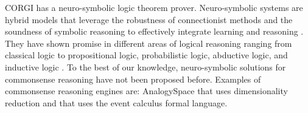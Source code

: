 
CORGI has a neuro-symbolic logic theorem prover. Neuro-symbolic systems are hybrid models that leverage the robustness of connectionist methods and the soundness of symbolic reasoning to effectively integrate learning and reasoning \cite{garcez2015neural,besold2017neural}. They have shown promise in different areas of logical reasoning ranging from classical logic to propositional logic, probabilistic logic, abductive logic, and inductive logic \cite{mao2019neuro, manhaeve2018deepproblog,dong2019neural,marra2019integrating,zhou2019abductive,evans2018learning}. To the best of our knowledge, neuro-symbolic solutions for commonsense reasoning have not been proposed before. Examples of commonsense reasoning engines are: AnalogySpace \cite{speer2008analogyspace,havasi2009digital} that uses dimensionality reduction
and \citet{mueller2014commonsense} that uses the event calculus formal language. 
